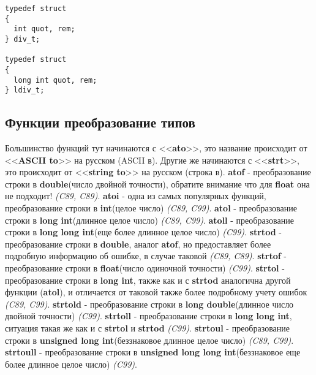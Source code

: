 \documentclass[12pt, letterpaper]{article}
\begin{document}
\begin{lstlisting}
typedef struct
{
  int quot, rem;
} div_t;

typedef struct
{
  long int quot, rem;
} ldiv_t;
\end{lstlisting}

\subsection{Функции преобразование типов}
Большинство функций тут начинаются с <<\textbf{ato}>>, это название происходит от <<\textbf{ASCII to}>> на русском (ASCII в).
Другие же начинаются с <<\textbf{strt}>>, это происходит от <<\textbf{string to}>> на русском (строка в).
\newline
\newline
\textbf{atof} - преобразование строки в \textbf{double}(число двойной точности), обратите внимание что для \textbf{float} она не подходит! \textit{(C89, C89)}.
\newline
\newline
\textbf{atoi} - одна из самых популярных функций, преобразование строки в \textbf{int}(целое число) \textit{(C89, C99)}.
\newline
\newline
\textbf{atol} - преобразование строки в \textbf{long int}(длинное целое число) \textit{(C89, C99)}.
\newline
\newline
\textbf{atoll} - преобразование строки в \textbf{long long int}(еще более длинное целое число) \textit{(C99)}.
\newline
\newline
\textbf{strtod} - преобразование строки в \textbf{double}, аналог \textbf{atof}, но предоставляет более подробную информацию об ошибке, в случае таковой \textit{(C89, C89)}.
\newline
\newline
\textbf{strtof} - преобразование строки в \textbf{float}(число одиночной точности) \textit{(C99)}.
\newline
\newline
\textbf{strtol} - преобразование строки в \textbf{long int}, также как и с \textbf{strtod} аналогична другой функции (\textbf{atol}), и отличается от таковой также более подробному учету ошибок \textit{(C89, C99)}.
\newline
\newline
\textbf{strtold} - преобразование строки в \textbf{long double}(длинное число двойной точности) \textit{(C99)}.
\newline
\newline
\textbf{strtoll} - преобразование строки в \textbf{long long int}, ситуация такая же как и с \textbf{strtol} и \textbf{strtod} \textit{(C99)}.
\newline
\newline
\textbf{strtoul} - преобразование строки в \textbf{unsigned long int}(беззнаковое длинное целое число) \textit{(C89, C99)}.
\newline
\newline
\textbf{strtoull} - преобразование строки в \textbf{unsigned long long int}(беззнаковое еще более длинное целое число) \textit{(C99)}.
\end{document}
